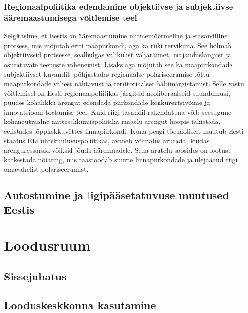\documentclass[]{book}
\begin{document}
\hypertarget{regionaalpoliitika-edendamine-objektiivse-ja-subjektiivse-aaremaastumisega-voitlemise-teel}{%
\subsection{Regionaalpoliitika edendamine objektiivse ja subjektiivse ääremaastumisega võitlemise teel}\label{regionaalpoliitika-edendamine-objektiivse-ja-subjektiivse-aaremaastumisega-voitlemise-teel}}

Selgitasime, et Eestis on ääremaastumine mitmemõõtmeline ja -tasandiline protsess, mis mõjutab eriti maapiirkondi, aga ka riiki tervikuna. See hõlmab objektiivseid protsesse, sealhulgas valikulist väljarännet, majanduslangust ja osutatavate teenuste vähenemist. Lisaks aga mõjutab see ka maapiirkondade subjektiivset kuvandit, põhjustades regionaalse polariseerumise tõttu maapiirkondade vähest nähtavust ja territoriaalset häbimärgistamist. Selle vastu võitlemisel on Eesti regionaalpoliitikas järgitud neoliberaalseid suundumusi, püüdes kohalikku arengut edendada piirkondade konkurentsivõime ja innovatsiooni toetamise teel. Kuid riigi tasandil rakendatuna võib seesugune kohaneutraalne mittesekkumispoliitika maaelu arengut hoopis takistada, eelistades lõppkokkuvõttes linnapiirkondi. Kuna peagi tõenäoliselt muutub Eesti staatus ELi ühtekuuluvuspoliitikas, avaneb võimalus arutada, kuidas arenguressursid võiksid jõuda ääremaadele. Seda arutelu soosides on lootust katkestada nõiaring, mis taastoodab suurte linnapiirkondade ja ülejäänud riigi omavahelist polariseerumist.

\hypertarget{regionaal_2.5}{%
\section{Autostumine ja ligipääsetatuvuse muutused Eestis}\label{regionaal_2.5}}

\hypertarget{chapter3}{%
\chapter{Loodusruum}\label{chapter3}}

\hypertarget{sissejuhatus-3}{%
\section*{Sissejuhatus}\label{sissejuhatus-3}}

\hypertarget{loodus_3.2}{%
\section{Looduskeskkonna kasutamine}\label{loodus_3.2}}
\end{document}
